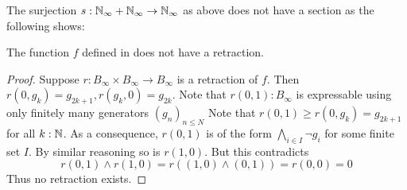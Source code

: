 The surjection $s:\mathbb{N}_{\infty} + \mathbb{N}_{\infty} \to \mathbb{N}_{\infty}$ as above does not have a section 
as the following shows:
\begin{lemma}
  The function $f$ defined in  does not have a retraction. 
\end{lemma}
\begin{proof}
  Suppose $r:B_\infty \times B_\infty \to B_\infty$ is a retraction of $f$. 
  Then $r(0,g_k) = g_{2k+1}, r(g_k,0) = g_{2k}$. 
  Note that $r(0,1):B_\infty$ is expressable using only finitely many generators $(g_n)_{n\leq N}$
  Note that $r(0,1) \geq r(0,g_k) = g_{2k+1}$ for all $k:\mathbb{N}$. 
  As a consequence, $r(0,1)$ is of the form $\bigwedge_{i\in I} \neg g_i$ for some finite set $I$.
  By similar reasoning so is $r(1,0)$. %
  But this contradicts
  $$r(0,1) \wedge r(1,0) = r( (1,0) \wedge (0,1)) = r(0,0) = 0$$
  Thus no retraction exists. 
\end{proof}


